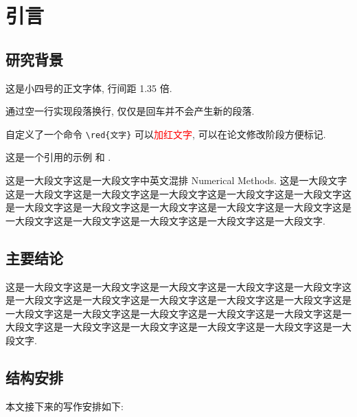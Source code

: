 \documentclass[UTF8,openany,twoside,12pt]{book}
\theoremstyle{plain}
\renewcommand{\contentsname}{目~~录}
\newcommand{\red}[1]{\textcolor{red}{#1}}
\begin{document}

\renewcommand\contentsname{目~~录}
\cleardoublepage
{}
\pdfbookmark[chapter]{\contentsname}{toc}
\tableofcontents



\mainmatter   %



\chapter{引言}

\section{研究背景}

这是小四号的正文字体, 行间距 1.35 倍.

通过空一行实现段落换行, 仅仅是回车并不会产生新的段落.

自定义了一个命令 \verb|\red{文字}| 可以\red{加红文字}, 可以在论文修改阶段方便标记.

这是一个引用的示例 \cite{Tadmor2012} 和 \cite{LiLiu1997,Adams2003,TreWei2014}.

这是一大段文字这是一大段文字中英文混排 Numerical Methods. 这是一大段文字这是一大段文字这是一大段文字这是一大段文字这是一大段文字这是一大段文字这是一大段文字这是一大段文字这是一大段文字这是一大段文字这是一大段文字这是一大段文字这是一大段文字这是一大段文字这是一大段文字这是一大段文字.

\section{主要结论}

这是一大段文字这是一大段文字这是一大段文字这是一大段文字这是一大段文字这是一大段文字这是一大段文字这是一大段文字这是一大段文字这是一大段文字这是一大段文字这是一大段文字这是一大段文字这是一大段文字这是一大段文字这是一大段文字这是一大段文字这是一大段文字这是一大段文字这是一大段文字这是一大段文字.



\section{结构安排}

本文接下来的写作安排如下:
\end{document}

